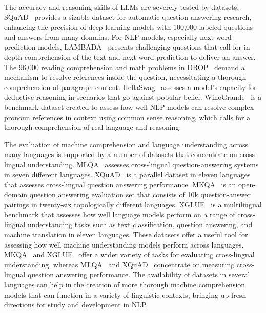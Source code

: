 \documentclass{article}
\begin{document}
{	The accuracy and reasoning skills of LLMs are severely tested by datasets. SQuAD~\cite{rajpurkar2016squad} provides a sizable dataset for automatic question-answering research, enhancing the precision of deep learning models with 100,000 labeled questions and answers from many domains. For NLP models, especially next-word prediction models, LAMBADA~\cite{paperno2016lambada} presents challenging questions that call for in-depth comprehension of the text and next-word prediction to deliver an answer. The 96,000 reading comprehension and math problems in DROP~\cite{dua2019drop} demand a mechanism to resolve references inside the question, necessitating a thorough comprehension of paragraph content. HellaSwag~\cite{zellers2019hellaswag} assesses a model's capacity for deductive reasoning in scenarios that go against popular belief. WinoGrande~\cite{sakaguchi2021winogrande} is a benchmark dataset created to assess how well NLP models can resolve complex pronoun references in context using common sense reasoning, which calls for a thorough comprehension of real language and reasoning.
	
	The evaluation of machine comprehension and language understanding across many languages is supported by a number of datasets that concentrate on cross-lingual understanding. MLQA~\cite{lewis2019mlqa} assesses cross-lingual question-answering systems in seven different languages. XQuAD~\cite{artetxe2019cross} is a parallel dataset in eleven languages that assesses cross-lingual question answering performance. MKQA~\cite{longpre2021mkqa} is an open-domain question answering evaluation set that consists of 10k question-answer pairings in twenty-six topologically different languages. XGLUE~\cite{liang2020xglue} is a multilingual benchmark that assesses how well language models perform on a range of cross-lingual understanding tasks such as text classification, question answering, and machine translation in eleven languages. These datasets offer a useful tool for assessing how well machine understanding models perform across languages. MKQA~\cite{longpre2021mkqa} and XGLUE~\cite{liang2020xglue} offer a wider variety of tasks for evaluating cross-lingual understanding, whereas MLQA~\cite{lewis2019mlqa} and XQuAD~\cite{artetxe2019cross} concentrate on measuring cross-lingual question answering performance. The availability of datasets in several languages can help in the creation of more thorough machine comprehension models that can function in a variety of linguistic contexts, bringing up fresh directions for study and development in NLP.
	
}
\end{document}
